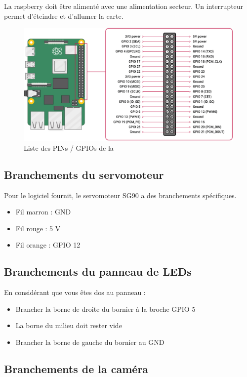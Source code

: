 La \gls{raspberry} doit être alimenté avec une alimentation secteur. Un interrupteur permet d'éteindre et d'allumer la carte.

\begin{figure}[H]
    \centering
    \includegraphics[width=\textwidth]{img/Rpi4_pin.png}
    \caption{Liste des PINs / GPIOs de la }
\end{figure}

\subsection{Branchements du servomoteur}

Pour le logiciel fournit, le servomoteur \gls{SG90} a des branchements spécifiques.
\begin{itemize}
    \item Fil marron : GND
    \item Fil rouge  : 5 V
    \item Fil orange : GPIO 12
\end{itemize}

\subsection{Branchements du panneau de LEDs}

En considérant que vous êtes dos au panneau :
\begin{itemize}
    \item Brancher la borne de droite du bornier à la broche GPIO 5
    \item La borne du milieu doit rester vide
    \item Brancher la borne de gauche du bornier au GND
\end{itemize}

\subsection{Branchements de la caméra}

